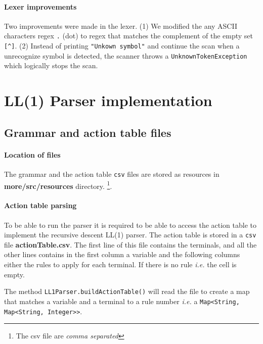 \documentclass[letterpaper]{article}
\begin{document}
\paragraph{Lexer improvements}

Two improvements were made in the lexer. (1) We modified the any ASCII
characters
regex \texttt{.} (dot) to regex that matches the complement of the
empty set \texttt{[\textasciicircum]}.
(2) Instead of printing \texttt{"Unkown symbol"}
and continue the scan when
a unrecognize symbol is detected, the scanner throws a
\texttt{UnknownTokenException} which logically stops the scan.



\section{LL(1) Parser implementation}

\subsection{Grammar and action table files}

\paragraph{Location of files}
The grammar and the action table \texttt{csv} files are stored
as resources in
\textbf{more/src/resources} directory.
\footnote{The csv file are \textit{comma separated}}.

\paragraph{Action table parsing}
To be able to run the parser it is required to be able to access
the action table to implement
the recursive descent LL(1) parser.
The action table is stored
in a \texttt{csv} file \textbf{actionTable.csv}.
The first line of this file contains the
terminals, and all the other lines contains in the first column a variable
and the following columns either the rules to apply for each terminal.
If there is no rule \textit{i.e.} the cell is empty.

The method \texttt{LL1Parser.buildActionTable()} will read the file
to create a map that matches a variable and a terminal to a rule number
\textit{i.e.} a \texttt{Map<String, Map<String, Integer>>}.
\end{document}
